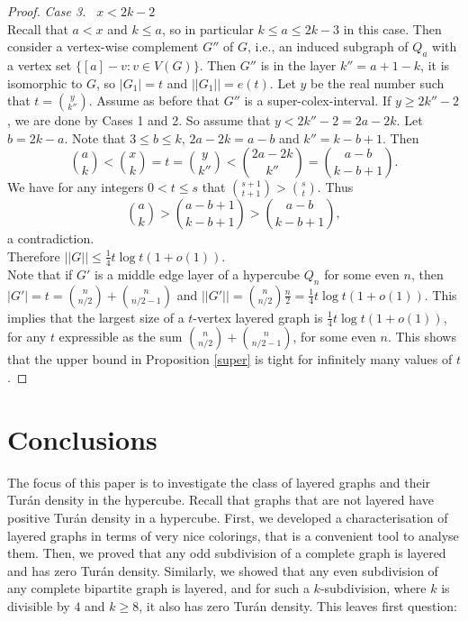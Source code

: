\documentclass[11pt, a4paper]{article}
\begin{document}
\begin{proof}
{\it Case 3.~ }  $x< 2k-2$\\
Recall that $a<x$ and $k\leq a$, so in particular $k\leq a\leq  2k-3$ in this case. Then consider a vertex-wise complement  $G''$ of  $G$, i.e., an induced subgraph of $Q_a$ with a vertex set $\{[a] -v: v\in V(G)\}$. Then $G''$ is in the layer $k''= a+1-k$, it is isomorphic to $G$, so  $|G_1|=t$ and  $||G_1|| = e(t)$. 
Let $y$ be the real number such that $t = \binom{y}{k''}$.   Assume as before that $G''$ is a super-colex-interval.
If $y\ge 2k'' -2$, we are done by Cases 1 and 2.
So assume that $y<2k'' -2= 2a-2k$. Let $b=2k-a$. Note that $3\leq b\leq k $, 
$2a-2k=a-b$ and $k''=k-b+1$. Then $$\binom{a}{k}<\binom{x}{k}= t = \binom{y}{k''}<\binom{2a-2k}{k''}=\binom{a-b}{k-b+1}.$$
We have for any integers $0<t\leq s$ that $\binom{s+1}{t+1} >\binom{s}{t}$. 
Thus  $$\binom{a}{k}>\binom{a-b+1}{k-b+1}>\binom{a-b}{k-b+1},$$ a contradiction.\\

Therefore  $||G|| \leq \frac{1}{4} t \log t (1+o(1))$.\\

Note that if $G'$  is a middle edge layer of a hypercube $Q_n$ for some even $n$,  then $|G'| = t =\binom{n}{n/2} + \binom{n}{n/2-1}$ and  $||G'|| = \binom{n}{n/2} \frac{n}{2} = \frac{1}{4} t \log t (1+o(1))$. This implies that the largest size of a $t$-vertex layered graph is  $\frac{1}{4} t \log t (1+o(1))$, for any $t $ expressible as the sum $\binom{n}{n/2} + \binom{n}{n/2-1}$, for some even $n$. This shows that the upper bound in Proposition \ref{super} is tight for infinitely many values of $t$.
\end{proof}
	
	
	
	



\section{Conclusions}\label{conclusions}

The focus of this paper is to investigate the class of layered graphs and their Tur\'an density in the hypercube. Recall that graphs that are not layered have positive Tur\'an density in a hypercube.
First, we developed a characterisation of layered graphs in terms of very nice colorings, that is a convenient tool to analyse them.
Then, we proved that any odd subdivision of a complete graph is layered and has  zero Tur\'an density. Similarly, we showed that any even subdivision of any complete bipartite graph is layered, and for such a $k$-subdivision, where $k$ is divisible by $4$ and $k\geq 8$,  it also has  zero Tur\'an density.  This leaves first question:\\
\end{document}
